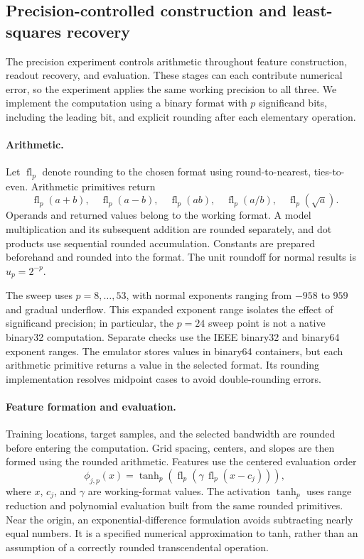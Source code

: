 \subsection{Precision-controlled construction and least-squares recovery}
\label{app:pbit-solver}

The precision experiment controls arithmetic throughout feature
construction, readout recovery, and evaluation. These stages can each
contribute numerical error, so the experiment applies the same working
precision to all three. We implement the computation using a binary
format with $p$ significand bits, including the leading bit, and
explicit rounding after each elementary operation.

\paragraph{Arithmetic.}
Let $\operatorname{fl}_p$ denote rounding to the chosen format using
round-to-nearest, ties-to-even. Arithmetic primitives return
\[
\operatorname{fl}_p(a+b),\quad
\operatorname{fl}_p(a-b),\quad
\operatorname{fl}_p(ab),\quad
\operatorname{fl}_p(a/b),\quad
\operatorname{fl}_p(\sqrt{a}).
\]
Operands and returned values belong to the working format.
A model multiplication and its subsequent addition are rounded
separately, and dot products use sequential rounded accumulation.
Constants are prepared beforehand and rounded into the format.
The unit roundoff for normal results is $u_p=2^{-p}$.

The sweep uses $p=8,\ldots,53$, with normal exponents ranging from
$-958$ to $959$ and gradual underflow. This expanded exponent range
isolates the effect of significand precision; in particular, the
$p=24$ sweep point is not a native binary32 computation. Separate
checks use the IEEE binary32 and binary64 exponent ranges.
The emulator stores values in binary64 containers, but each arithmetic
primitive returns a value in the selected format. Its rounding
implementation resolves midpoint cases to avoid double-rounding errors.

\paragraph{Feature formation and evaluation.}
Training locations, target samples, and the selected bandwidth are
rounded before entering the computation. Grid spacing, centers, and
slopes are then formed using the rounded arithmetic. Features use
the centered evaluation order
\[
\phi_{j,p}(x)
=
\tanh_p\!\left(
  \operatorname{fl}_p\!\left(
    \gamma\,\operatorname{fl}_p(x-c_j)
  \right)
\right),
\]
where $x$, $c_j$, and $\gamma$ are working-format values.
The activation $\tanh_p$ uses range reduction and polynomial
evaluation built from the same rounded primitives. Near the origin,
an exponential-difference formulation avoids subtracting nearly equal
numbers. It is a specified numerical approximation to tanh, rather
than an assumption of a correctly rounded transcendental operation.

